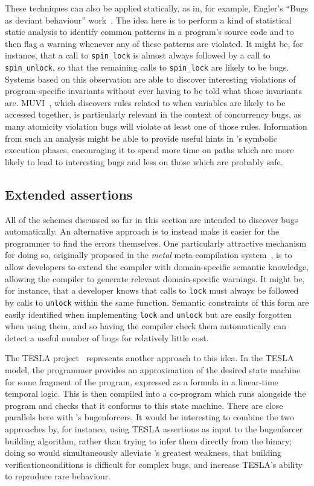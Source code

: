 These techniques can also be applied statically, as in, for example,
Engler's ``Bugs as deviant behaviour'' work~\cite{Engler2001}.  The
idea here is to perform a kind of statistical static analysis to
identify common patterns in a program's source code and to then flag a
warning whenever any of these patterns are violated.  It might be, for
instance, that a call to \texttt{spin\_lock} is almost always followed
by a call to \texttt{spin\_unlock}, so that the remaining calls to
\texttt{spin\_lock} are likely to be bugs.  Systems based on this
observation are able to discover interesting violations of
program-specific invariants without ever having to be told what those
invariants are.  MUVI~\cite{Lu2007}, which discovers rules related to
when variables are likely to be accessed together, is particularly
relevant in the context of concurrency bugs, as many atomicity
violation bugs will violate at least one of those rules.  Information
from such an analysis might be able to provide useful hints in
{\technique}'s symbolic execution phases, encouraging it to spend more
time on paths which are more likely to lead to interesting bugs and
less on those which are probably safe.

\subsection{Extended assertions}

All of the schemes discussed so far in this section are intended to
discover bugs automatically.  An alternative approach is to instead
make it easier for the programmer to find the errors themselves.  One
particularly attractive mechanism for doing so, originally proposed in
the \textit{metal} meta-compilation system~\cite{Engler2000a}, is to
allow developers to extend the compiler with domain-specific semantic
knowledge, allowing the compiler to generate relevant domain-specific
warnings.  It might be, for instance, that a developer knows that
calls to \texttt{lock} must always be followed by calls to
\texttt{unlock} within the same function.  Semantic constraints of
this form are easily identified when implementing \texttt{lock} and
\texttt{unlock} but are easily forgotten when using them, and so
having the compiler check them automatically can detect a useful
number of bugs for relatively little cost.

The TESLA project~\cite{FFFLocielski2011,FFFWatson2013} represents
another approach to this idea.  In the TESLA model, the programmer
provides an approximation of the desired state machine for some
fragment of the program, expressed as a formula in a linear-time
temporal logic.  This is then compiled into a co-program which runs
alongside the program and checks that it conforms to this state
machine.  There are close parallels here with {\technique}'s
\glspl{bugenforcer}.  It would be interesting to combine the two
approaches by, for instance, using TESLA assertions as input to the
\gls{bugenforcer} building algorithm, rather than trying to infer them
directly from the binary; doing so would simultaneously alleviate
{\technique}'s greatest weakness, that building
\glspl{verificationcondition} is difficult for complex bugs, and
increase TESLA's ability to reproduce rare behaviour.

